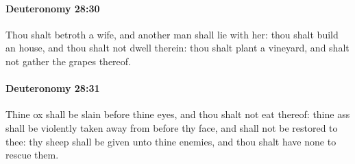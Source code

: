 		\paragraph{Deuteronomy 28:30} %
			\label{DEUTERONOMY-28-30}

			Thou shalt betroth a wife, and another man shall lie with her: thou shalt build an house, and thou shalt not dwell therein: thou shalt plant a vineyard, and shalt not gather the grapes thereof.


		\paragraph{Deuteronomy 28:31} %
			\label{DEUTERONOMY-28-31}

			Thine ox shall be slain before thine eyes, and thou shalt not eat thereof: thine ass shall be violently taken away from before thy face, and shall not be restored to thee: thy sheep shall be given unto thine enemies, and thou shalt have none to rescue them.

